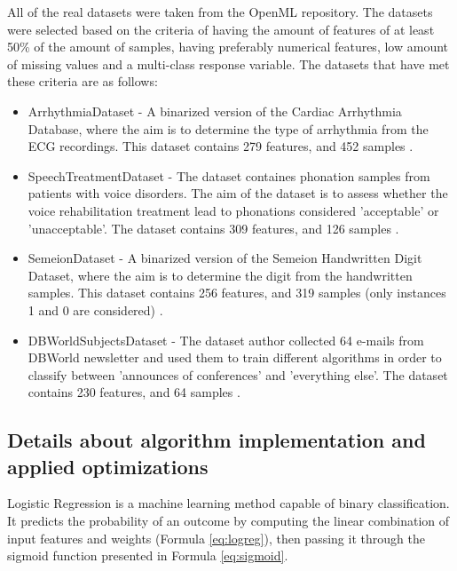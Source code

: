\documentclass[12pt]{article}
\begin{document}
All of the real datasets were taken from the OpenML \cite{OpenML2013} repository. The datasets were selected based on the criteria of having the amount of features of at least 50\% of the amount of samples, having preferably numerical features, low amount of missing values and a multi-class response variable. The datasets that have met these criteria are as follows:
\begin{itemize}
    \item ArrhythmiaDataset - A binarized version of the Cardiac Arrhythmia Database, where the aim is to determine the type of arrhythmia from the ECG recordings. This dataset contains 279 features, and 452 samples \cite{arrhythmia_5}.
    \item SpeechTreatmentDataset - The dataset containes phonation samples from patients with voice disorders. The aim of the dataset is to assess whether the voice rehabilitation treatment lead to phonations considered 'acceptable' or 'unacceptable'. The dataset contains 309 features, and 126 samples \cite{lsvt_voice_rehabilitation_282}.
    
    \item SemeionDataset - A binarized version of the Semeion Handwritten Digit Dataset, where the aim is to determine the digit from the handwritten samples. This dataset contains 256 features, and 319 samples (only instances 1 and 0 are considered) \cite{semeion_handwritten_digit_178}.
    \item DBWorldSubjectsDataset - The dataset author collected 64 e-mails from DBWorld newsletter and used them to train different algorithms in order to classify between 'announces of conferences' and 'everything else'. The dataset contains 230 features, and 64 samples \cite{dbworld_e-mails_219}.

\end{itemize}


\subsection{Details about algorithm implementation and applied optimizations}


Logistic Regression is a machine learning method capable of binary classification. It predicts the probability of an outcome by computing the linear combination of input features and weights (Formula \ref{eq:logreg}), then passing it through the sigmoid function presented in Formula \ref{eq:sigmoid}. 
\end{document}
